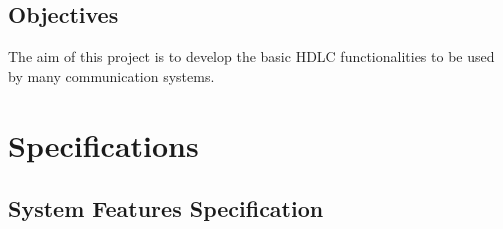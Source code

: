 \documentclass[a4paper,11pt]{article}
\begin{document}

\subsection{Objectives}
The aim of this project is to develop the basic HDLC functionalities to be used by many communication systems.


\section{Specifications}

\subsection{System Features Specification}
\end{document}
